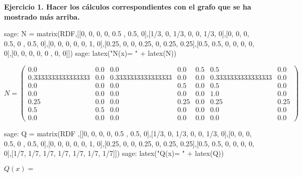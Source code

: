 
\begin{ejer}
    \textbf{Ejercicio 1. Hacer los cálculos correspondientes con el grafo que se ha mostrado más arriba.}
\end{ejer}

\begin{sagecommandline}
    sage: N = matrix(RDF,[[0, 0, 0, 0, 0.5 , 0.5, 0],[1/3, 0, 1/3, 0, 0, 1/3, 0],[0, 0, 0, 0.5, 0 , 0.5, 0],[0, 0, 0, 0, 0, 1, 0],[0.25, 0, 0, 0.25, 0, 0.25, 0.25],[0.5, 0.5, 0, 0, 0, 0, 0],[0, 0, 0, 0, 0 , 0, 0]])
    sage: latex("N(x)= " + latex(N))
\end{sagecommandline}

$N=\left(\begin{array}{rrrrrrr}
            0.0 & 0.0 & 0.0 & 0.0 & 0.5 & 0.5 & 0.0 \\
            0.3333333333333333 & 0.0 & 0.3333333333333333 & 0.0 & 0.0 & 0.3333333333333333 & 0.0 \\
            0.0 & 0.0 & 0.0 & 0.5 & 0.0 & 0.5 & 0.0 \\
            0.0 & 0.0 & 0.0 & 0.0 & 0.0 & 1.0 & 0.0 \\
            0.25 & 0.0 & 0.0 & 0.25 & 0.0 & 0.25 & 0.25 \\
            0.5 & 0.5 & 0.0 & 0.0 & 0.0 & 0.0 & 0.0 \\
            0.0 & 0.0 & 0.0 & 0.0 & 0.0 & 0.0 & 0.0 
        \end{array}
    \right)$

\begin{sagecommandline}
    sage: Q = matrix(RDF ,[[0, 0, 0, 0, 0.5 , 0.5, 0],[1/3, 0, 1/3, 0, 0, 1/3, 0],[0, 0, 0, 0.5, 0 , 0.5, 0],[0, 0, 0, 0, 0, 1, 0],[0.25, 0, 0, 0.25, 0, 0.25, 0.25],[0.5, 0.5, 0, 0, 0, 0, 0],[1/7, 1/7, 1/7, 1/7, 1/7, 1/7, 1/7]])
    sage: latex("Q(x)= " + latex(Q))
\end{sagecommandline}

$Q(x)= $

